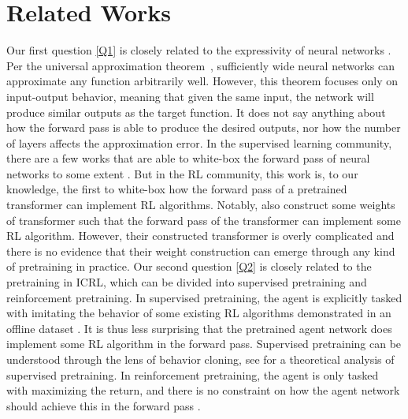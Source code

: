 \documentclass{article}
\begin{document}
\section{Related Works}
Our first question \ref{Q1} is closely related to the expressivity of neural networks \citep{siegelmann1992computational,graves2014neural,jastrzkebski2017residual,hochreiter2001meta, lu2017expressive}.
Per the universal approximation theorem~\citep{hornik1989universal, cybenko1989approximation,leshno1993multilayer,bengio2017deep},
sufficiently wide neural networks can approximate any function arbitrarily well.
However, this theorem focuses only on input-output behavior, meaning that given the same input, the network will produce similar outputs as the target function.
It does not say anything about how the forward pass is able to produce the desired outputs, nor how the number of layers affects the approximation error.
In the supervised learning community, there are a few works that are able to white-box the forward pass of neural networks to some extent \citep{frosst2017distilling, alvarez2018towards,chan2022redunet,yu2023white,vonoswald2023transformers,ahn2024transformers}.
But in the RL community, this work is, to our knowledge, the first to white-box how the forward pass of a pretrained transformer can implement RL algorithms.
Notably, \citet{lin2023transformers} also construct some weights of transformer such that the forward pass of the transformer can implement some RL algorithm.
However,
their constructed transformer is overly complicated and there is no evidence that their weight construction can emerge through any kind of pretraining in practice.
Our second question \ref{Q2} is closely related to the pretraining in ICRL,
which can be divided into supervised pretraining and reinforcement pretraining.
In supervised pretraining,
the agent is explicitly tasked with imitating the behavior of some existing RL algorithms demonstrated in an offline dataset \citep{xu2022prompting,laskin2022context,raparthy2023generalization,sinii2023context,zisman2023emergence,shi2024cross,dai2024context,huang2024context,huang2024decision,kirsch2023towards,wang2024hierarchical,lee2024supervised}.
It is thus less surprising \citep{krishnamurthy2024can} that the pretrained agent network does implement some RL algorithm in the forward pass.
Supervised pretraining can be understood through the lens of behavior cloning,
see \citet{lin2023transformers} for a theoretical analysis of supervised pretraining.
In reinforcement pretraining,
the agent is only tasked with maximizing the return, and there is no constraint on how the agent network should achieve this in the forward pass \citep{duan2016rl,wang2016learning,kirsch2022symmetry,bauer2023human,grigsby2023amago,lus42023,park2024llm,xu2024meta,grigsby2024amago,cook2024artificial}.
\end{document}
